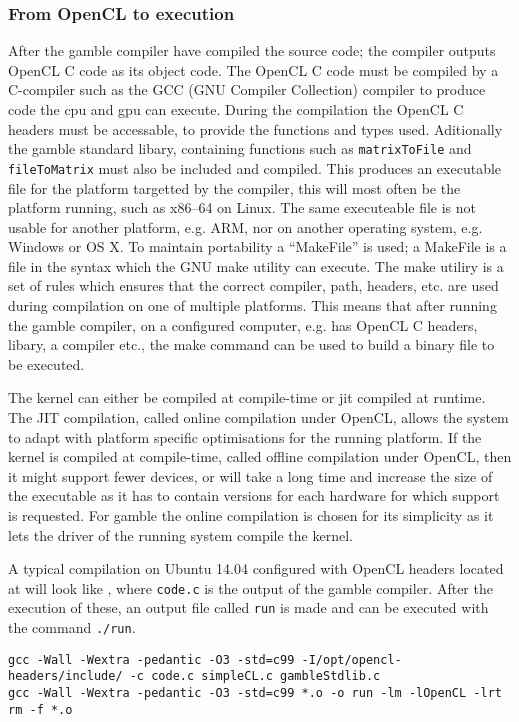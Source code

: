 \subsubsection*{From OpenCL to execution}\label{makefile}
After the \gls{gamble} compiler have compiled the source code; the compiler outputs OpenCL C code as its object code.
The OpenCL C code must be compiled by a C-compiler such as the GCC (GNU Compiler Collection) compiler to produce code the \acrshort{cpu} and \acrshort{gpu} can execute.
During the compilation the OpenCL C headers must be accessable, to provide the functions and types used. 
Aditionally the \gls{gamble} standard libary, containing functions such as \texttt{matrixToFile} and \texttt{fileToMatrix} must also be included and compiled. 
This produces an executable file for the platform targetted by the compiler, this will most often be the platform running, such as x86--64 on Linux.
The same executeable file is not usable for another platform, e.g. ARM, nor on another operating system, e.g. Windows or OS X.
To maintain portability a ``MakeFile'' is used; a MakeFile is a file in the syntax which the GNU make utility can execute. 
The make utiliry is a set of rules which ensures that the correct compiler, path, headers, etc. are used during compilation on one of multiple platforms. 
This means that after running the \gls{gamble} compiler, on a configured computer, e.g. has OpenCL C headers, libary, a compiler etc., the make command can be used to build a binary file to be executed.

The kernel can either be compiled at compile-time or \acrshort{jit} compiled at runtime.
The JIT compilation, called online compilation under OpenCL, allows the system to adapt with platform specific optimisations for the running platform.
If the kernel is compiled at compile-time, called offline compilation under OpenCL, then it might support fewer devices, or will take a long time and increase the size of the executable as it has to contain versions for each hardware for which support is requested. \citep{openclbookjit}
For \gls{gamble} the online compilation is chosen for its simplicity as it lets the driver of the running system compile the kernel. 

A typical compilation on Ubuntu 14.04 configured with OpenCL headers located at  will look like , where \texttt{code.c} is the output of the \gls{gamble} compiler.
After the execution of these, an output file called \texttt{run} is made and can be executed with the command \texttt{./run}. 

\begin{lstlisting}[caption=The commands executed by the make command according to the rules of the MakeFile,numbers=none,frame=tlrb,label={lst:makecommands}]
gcc -Wall -Wextra -pedantic -O3 -std=c99 -I/opt/opencl-headers/include/ -c code.c simpleCL.c gambleStdlib.c
gcc -Wall -Wextra -pedantic -O3 -std=c99 *.o -o run -lm -lOpenCL -lrt
rm -f *.o
\end{lstlisting}
